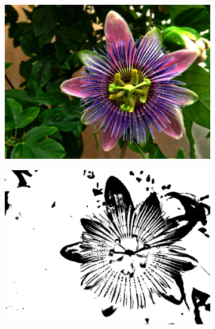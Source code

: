 \documentclass{article}
\begin{document}
\begin{figure}[H]
\begin{subfigure}{.3\textwidth}
  \centering
  \includegraphics[width=0.97\linewidth]{_Figures/sample_2.jpg}
  \caption{}
  \label{fig:tresh_raw_2}
\end{subfigure}%
\begin{subfigure}{.3\textwidth}
  \centering
  \includegraphics[width=0.97\linewidth]{_Figures/sample_2_good_treshold.png}
  \caption{}
  \label{fig:tresh_good_2}
\end{subfigure}%
\begin{subfigure}{.3\textwidth}
  \centering

\end{subfigure}
\end{figure}
\end{document}
